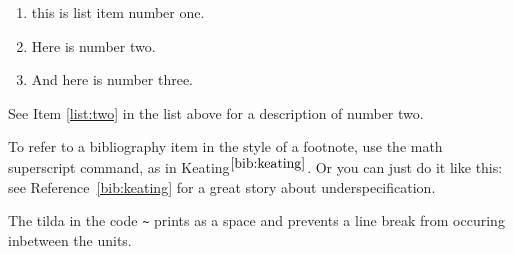 \documentclass[12pt,twoside,leqno]{article}%
\begin{document}
\begin{enumerate}
\item \label{list:one} this is list item number one.
\item \label{list:two} Here is number two.
\item \label{list:three} And here is number three.
\end{enumerate}

See Item \ref{list:two} in the list above for a description of number two.


To refer to a bibliography item in the style of a footnote, use the math superscript command, as in Keating$^{\ref{bib:keating}}$. Or you can just do it like this: see Reference~\ref{bib:keating} for a great story about underspecification.

The tilda in the code \verb!~! prints as a space and prevents a line break from occuring inbetween the units.
\end{document}
